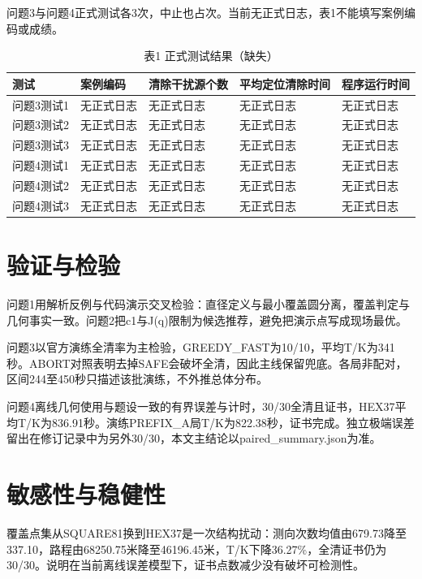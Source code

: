 \documentclass[UTF8,12pt,a4paper,fontset=none]{ctexart}
\begin{document}
问题3与问题4正式测试各3次，中止也占次。当前无正式日志，表1不能填写案例编码或成绩。

\begin{table}[!htbp]
  \centering
  \caption{表1 正式测试结果（缺失）}
  \label{tab-formal-missing}
  \begin{tabularx}{\textwidth}{>{\centering\arraybackslash}X>{\centering\arraybackslash}X>{\centering\arraybackslash}X>{\centering\arraybackslash}X>{\centering\arraybackslash}X}
    \toprule
    测试 & 案例编码 & 清除干扰源个数 & 平均定位清除时间 & 程序运行时间 \\
    \midrule
    问题3测试1 & 无正式日志 & 无正式日志 & 无正式日志 & 无正式日志 \\
问题3测试2 & 无正式日志 & 无正式日志 & 无正式日志 & 无正式日志 \\
问题3测试3 & 无正式日志 & 无正式日志 & 无正式日志 & 无正式日志 \\
问题4测试1 & 无正式日志 & 无正式日志 & 无正式日志 & 无正式日志 \\
问题4测试2 & 无正式日志 & 无正式日志 & 无正式日志 & 无正式日志 \\
问题4测试3 & 无正式日志 & 无正式日志 & 无正式日志 & 无正式日志 \\
    \bottomrule
  \end{tabularx}
\end{table}

\section{验证与检验}

问题1用解析反例与代码演示交叉检验：直径定义与最小覆盖圆分离，覆盖判定与几何事实一致。问题2把c1与J(q)限制为候选推荐，避免把演示点写成现场最优。

问题3以官方演练全清率为主检验，GREEDY\_FAST为10/10，平均T/K为341秒。ABORT对照表明去掉SAFE会破坏全清，因此主线保留兜底。各局非配对，区间244至450秒只描述该批演练，不外推总体分布。

问题4离线几何使用与题设一致的有界误差与计时，30/30全清且证书，HEX37平均T/K为836.91秒。演练PREFIX\_A局T/K为822.38秒，证书完成。独立极端误差留出在修订记录中为另外30/30，本文主结论以paired\_summary.json为准。

\section{敏感性与稳健性}

覆盖点集从SQUARE81换到HEX37是一次结构扰动：测向次数均值由679.73降至337.10，路程由68250.75米降至46196.45米，T/K下降36.27\%，全清证书仍为30/30。说明在当前离线误差模型下，证书点数减少没有破坏可检测性。
\end{document}
